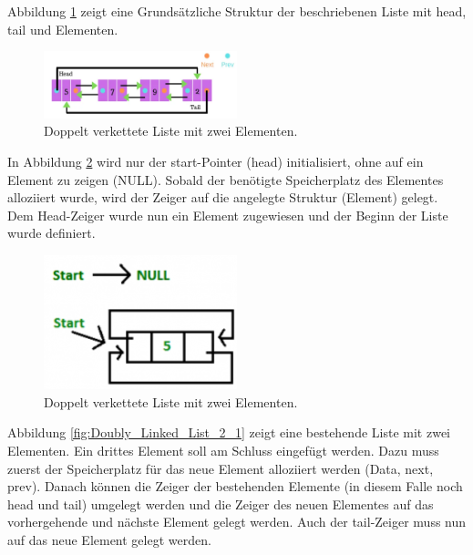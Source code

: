 Abbildung \ref{fig:Doubly_Linked_List_2_00} zeigt eine Grundsätzliche Struktur der beschriebenen Liste mit head, tail und Elementen.

\begin{figure}[h!]
	\centering
	\includegraphics[width=0.5\textwidth]{graphics/Doubly_Linked_List_2_00}
	\caption{Doppelt verkettete Liste mit zwei Elementen.}
	\label{fig:Doubly_Linked_List_2_00}
\end{figure}


In Abbildung \ref{fig:Doubly_Linked_List_2_0} wird nur der start-Pointer (head) initialisiert, ohne auf ein Element zu zeigen (NULL). Sobald der benötigte Speicherplatz des Elementes alloziiert wurde, wird der Zeiger auf die angelegte Struktur (Element) gelegt. Dem Head-Zeiger wurde nun ein Element zugewiesen und der Beginn der Liste wurde definiert.

\begin{figure}[h!]
	\centering
	\includegraphics[width=0.5\textwidth]{graphics/Doubly_Linked_List_2_0}
	\caption{Doppelt verkettete Liste mit zwei Elementen.}
	\label{fig:Doubly_Linked_List_2_0}
\end{figure}


Abbildung \ref{fig:Doubly_Linked_List_2_1} zeigt eine bestehende Liste mit zwei Elementen. Ein drittes Element soll am Schluss eingefügt werden. Dazu muss zuerst der Speicherplatz für das neue Element alloziiert werden (Data, next, prev). Danach können die Zeiger der bestehenden Elemente (in diesem Falle noch head und tail) umgelegt werden und die Zeiger des neuen Elementes auf das vorhergehende und nächste Element gelegt werden. Auch der tail-Zeiger muss nun auf das neue Element gelegt werden.

